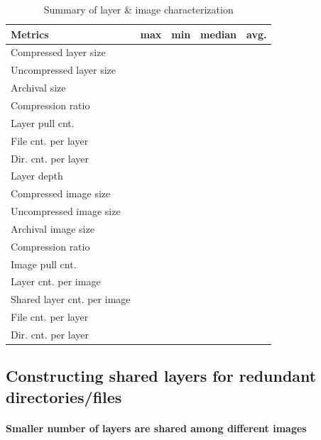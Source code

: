 \begin{table} 
	\centering 
	\scriptsize  
	\caption{Summary of layer \& image characterization} \label{tbl:redundant_ratio} 
	\begin{tabular}{|l|l|l|l|l|}%
		\hline 
		Metrics & max & min & median & avg.\\
		\hline
		Compressed layer size &   &   &   &  \\
		\hline
		Uncompressed layer size &   &   &    &  \\
		\hline
		Archival size &  &  & & \\
		\hline
		Compression ratio &   &   &    &  \\
		\hline
		Layer pull cnt. &  &  & & \\
		\hline
		File cnt. per layer &  &  & & \\
		\hline
		Dir. cnt. per layer &  &  & & \\
		\hline
		Layer depth &  &  & & \\
		\hline
		\hline
		Compressed image size &  &  & & \\
		\hline
		Uncompressed image size & &  &  & \\
		\hline
		Archival image size & &  &  & \\
		\hline
		Compression ratio &   &   &    &  \\
		\hline
		Image pull cnt.  &  &  & & \\
		\hline
		Layer cnt. per image  &  &  & & \\
		\hline
		Shared layer cnt. per image  &  &  & & \\
		\hline
		File cnt. per layer &  &  & & \\
		\hline
		Dir. cnt. per layer &  &  & & \\
		\hline	
	\end{tabular} 
\end{table} 

\subsection{Constructing shared layers for redundant directories/files}

\paragraph{Smaller number of layers are shared among different images}


